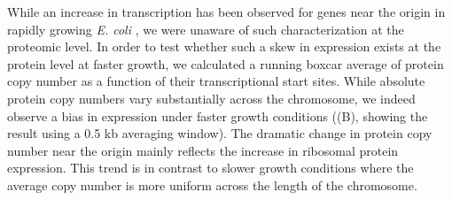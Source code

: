 While an increase in transcription has been observed for genes
near the origin in rapidly growing \textit{E. coli}  \citep{scholz2019}, we were
unaware of such characterization at the proteomic level. In order to test
whether such a skew in expression exists at the protein level at faster
growth, we calculated a running boxcar average of protein copy number as a
function of their transcriptional start sites. While absolute protein copy
numbers vary substantially across the chromosome, we indeed observe a bias in
expression under faster growth conditions ((B),
showing the result using a 0.5 kb averaging window). The dramatic change in
protein copy number near the origin mainly reflects the increase in ribosomal
protein expression. This trend is in contrast to slower growth conditions where
the average copy number is more uniform across the length of the chromosome.


